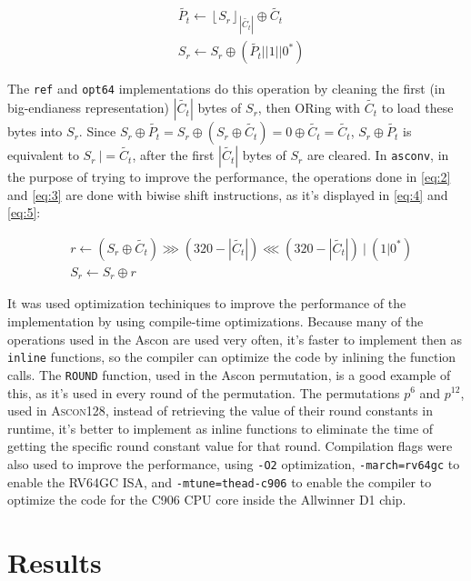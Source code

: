 \documentclass[11pt,twoside]{article}
\begin{document}
\begin{align}
   & \tilde{P_{t}} \leftarrow  {\left \lfloor S_{r}  \right \rfloor}_{\left| \tilde{C_{t}} \right|} \oplus \tilde{C_{t}} \label{eq:2} \\
   & S_r \leftarrow S_r \oplus (\tilde{P_{t}} || 1 || 0^{*}) \label{eq:3}
\end{align}

The \texttt{ref} and \texttt{opt64} implementations do this operation by cleaning the first (in big-endianess representation) $| \tilde{C_{t}} |$ bytes of $S_r$, then ORing with $\tilde{C_t}$ to load these bytes into $S_r$. Since $S_r \oplus \tilde{P_t} = S_r \oplus  (S_r \oplus \tilde{C_t}) = 0 \oplus \tilde{C_t} = \tilde{C_t}$, $S_r \oplus \tilde{P_t}$ is equivalent to $S_{r} \ |= \tilde{C_t}$, after the first $| \tilde{C_{t}} |$ bytes of $S_r$ are cleared. In \texttt{asconv}, in the purpose of trying to improve the performance, the operations done in \cref{eq:2} and \cref{eq:3} are done with biwise shift instructions, as it's displayed in \cref{eq:4} and \cref{eq:5}:

\begin{align}
   & r \leftarrow (S_r \oplus \tilde{C_{t}}) \ggg (320 - | \tilde{C_{t}}|) \lll (320 - | \tilde{C_{t}} |) \ | \ (1|0^*) \label{eq:4} \\
   & S_r \leftarrow S_r \oplus r \label{eq:5}
\end{align}

It was used optimization techiniques to improve the performance of the implementation by using compile-time optimizations. Because many of the operations used in the Ascon are used very often, it's faster to implement then as \texttt{inline} functions, so the compiler can optimize the code by inlining the function calls. The \texttt{ROUND} function, used in the Ascon permutation, is a good example of this, as it's used in every round of the permutation. The permutations $p^6$ and $p^{12}$, used in \textsc{Ascon128}, instead of retrieving the value of their round constants in runtime, it's better to implement as inline functions to eliminate the time of getting the specific round constant value for that round. Compilation flags were also used to improve the performance, using \texttt{-O2} optimization, \texttt{-march=rv64gc} to enable the RV64GC ISA, and \texttt{-mtune=thead-c906} to enable the compiler to optimize the code for the C906 CPU core inside the Allwinner D1 chip.

\section{Results}
\end{document}
